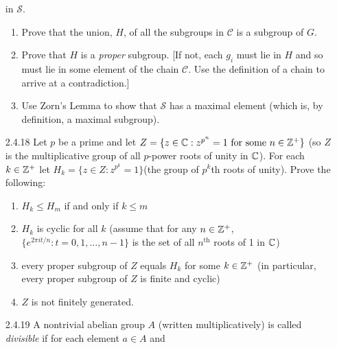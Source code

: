 \begin{enumerate}
                  in $\mathcal{S}$.
                  \begin{enumerate}
                     \item Prove that the union, $H$, of all the subgroups in
                           $\mathcal{C}$ is a subgroup of $G$.
                     \item Prove that $H$ is a \textit{proper} subgroup. [If
                           not, each $g_i$ must lie in $H$ and so must lie in
                           some element of the chain $\mathcal{C}$. Use the
                           definition of a chain to arrive at a contradiction.]
                     \item Use Zorn's Lemma to show that $\mathcal{S}$ has a
                           maximal element (which is, by definition, a maximal
                           subgroup).
                  \end{enumerate}
   \item[2.4.18]  Let $p$ be a prime and let
                  $Z = \{z \in \mathbb{C} : z^{p^n} = 1 \text{ for some } n \in \mathbb{Z}^+\}$
                  (so $Z$ is the multiplicative group of all $p$-power roots of
                  unity in $\mathbb{C}$). For each $k \in \mathbb{Z}^+$ let
                  $H_k = \{z \in Z : z^{p^k} = 1\}$(the group of $p^k$th roots
                  of unity). Prove the following:
                  \begin{enumerate}
                     \item $H_k \le H_m$ if and only if $k \le m$
                     \item $H_k$ is cyclic for all $k$ (assume that for any
                           $n \in \mathbb{Z}^+$, $\{e^{2\pi it/n}:t =0,1,\ldots, n-1\}$
                           is the set of all $n^{\text{th}}$ roots of 1 in
                           $\mathbb{C}$)
                     \item every proper subgroup of $Z$ equals $H_k$ for some
                           $k \in \mathbb{Z}^+$ (in particular, every proper subgroup of
                           $Z$ is finite and cyclic)
                     \item $Z$ is not finitely generated.
                  \end{enumerate}
   \item[2.4.19]  A nontrivial abelian group $A$ (written multiplicatively) is
                  called \textit{divisible} if for each element $a \in A$ and

\end{enumerate}
